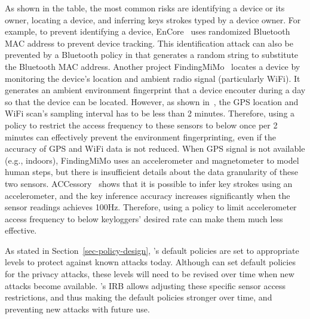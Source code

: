 As shown in the table, the most common risks are identifying a device or its 
owner, locating a device, and inferring keys strokes typed by a device owner. 
For example, to prevent identifying a device, EnCore~\cite{aditya2014encore} 
uses randomized Bluetooth MAC address to prevent device tracking. This 
identification attack can also be
prevented by a Bluetooth policy in \sysname that generates a random string to 
substitute the Bluetooth MAC address. Another project FindingMiMo~\cite{shin2011findingmimo} 
locates a device by monitoring the device's location and ambient radio signal 
(particularly WiFi). It generates an ambient environment fingerprint that a 
device encouter during a day so that the device can be located. However, as 
shown in~\cite{shin2011findingmimo}, the GPS location and WiFi scan's sampling 
interval has to be less than 2 minutes. Therefore, using a \sysname policy to 
restrict the access frequency to these sensors to below once per 2 minutes can 
effectively prevent the environment fingerprinting, even if the accuracy of GPS 
and WiFi data is not reduced. When GPS signal is not available (e.g., indoors), 
FindingMiMo uses an accelerometer and magnetometer to model human steps,
but there is insufficient details about the data granularity of these two sensors. 
ACCessory~\cite{owusu2012accessory} shows that it is possible to infer key 
strokes using an accelerometer, and the key inference accuracy increases 
significantly when the sensor readings achieves 100Hz. Therefore, using a 
policy to limit accelerometer access frequency to below keyloggers' desired 
rate can make them much less effective. 

As stated in Section~\ref{sec-policy-design}, \sysname's default policies are 
set to appropriate levels to protect against known attacks today. 
Although \sysname can set default policies for the privacy attacks, these 
levels will need to be revised over time when new attacks become available. 
\sysname's IRB allows adjusting these specific sensor access restrictions, 
and thus making the default policies stronger over time, and preventing new 
attacks with future use.

